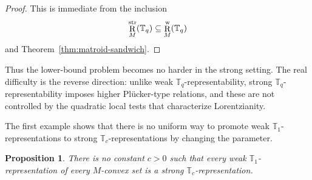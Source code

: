 \documentclass[12pt]{amsart}
\newtheorem{proposition}[theorem]{Proposition}
\theoremstyle{definition}
\newcommand{\1}{\mathbf{1}}
\DeclareMathOperator{\upR}{R}   %
\newcommand\T{{\mathbb T}}
\begin{document}
\begin{proof}
This is immediate from the inclusion
\[
\upR_M^{\rm str}(\T_q)\subseteq \upR_M^{\rm w}(\T_q)
\]
and Theorem~\ref{thm:matroid-sandwich}.
\end{proof}

Thus the lower-bound problem becomes no harder in the strong setting. The real difficulty
is the reverse direction: unlike weak $\T_q$-representability, strong
$\T_q$-representability imposes higher Pl\"ucker-type relations, and these are not
controlled by the quadratic local tests that characterize Lorentzianity.

The first example shows that there is no uniform way to promote weak $\T_1$-representations
to strong $\T_c$-representations by changing the parameter.

\begin{proposition}
\label{prop:no-uniform-weak-to-strong}
There is no constant $c>0$ such that every weak $\T_1$-representation of every
$M$-convex set is a strong $\T_c$-representation.
\end{proposition}
\end{document}
